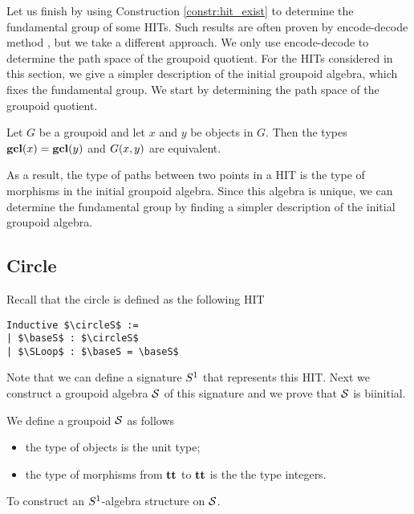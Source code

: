 Let us finish by using Construction \ref{constr:hit_exist} to determine the fundamental group of some HITs.
Such results are often proven by encode-decode method \cite{LicataS13,LicataF14}, but we take a different approach.
We only use encode-decode to determine the path space of the groupoid quotient.
For the HITs considered in this section, we give a simpler description of the initial groupoid algebra, which fixes the fundamental group.
We start by determining the path space of the groupoid quotient.

\begin{proposition}
\label{prop:groupoid_quot_encode_decode}
Let $G$ be a groupoid and let $x$ and $y$ be objects in $G$.
Then the types $\operatorname{\mathbf{gcl}}(x) = \operatorname{\mathbf{gcl}}(y)$ and $G(x, y)$ are equivalent.
\end{proposition}

As a result, the type of paths between two points in a HIT is the type of morphisms in the initial groupoid algebra.
Since this algebra is unique, we can determine the fundamental group by finding a simpler description of the initial groupoid algebra.

\subsection{Circle}
\label{sec:circle_fund_group}
Recall that the circle is defined as the following HIT

\begin{lstlisting}[mathescape=true]
Inductive $\circleS$ :=
| $\baseS$ : $\circleS$
| $\SLoop$ : $\baseS = \baseS$
\end{lstlisting}

Note that we can define a signature $S^1$ that represents this HIT.
Next we construct a groupoid algebra $\mathcal{S}$ of this signature and we prove that $\mathcal{S}$ is biinitial.

\begin{definition}
We define a groupoid $\mathcal{S}$ as follows
\begin{itemize}
	\item the type of objects is the unit type;
	\item the type of morphisms from $\operatorname{\mathbf{tt}}$ to $\operatorname{\mathbf{tt}}$ is the the type integers.
\end{itemize}
\end{definition}

\begin{problem}
\label{prob:initial_grpd_alg_circle}
To construct an $S^1$-algebra structure on $\mathcal{S}$.
\end{problem}

